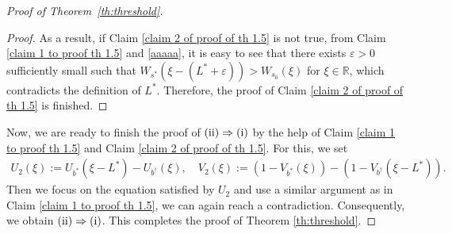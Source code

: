 \documentclass[11pt,a4paper]{article}
\numberwithin{equation}{section}
\numberwithin{figure}{section}
\newcommand\beaa{\begin{eqnarray*}}
\newcommand\eeaa{\end{eqnarray*}}
\begin{document}
\begin{proof}[Proof of Theorem~\ref{th:threshold}]
\begin{proof}
As a result, if Claim \ref{claim 2 of proof of th 1.5} is not true,
from Claim \ref{claim 1 to proof th 1.5} and \eqref{aaaaa}, %
it is easy to see that there exists
$\varepsilon>0$ sufficiently small such that
$W_{s^*}(\xi-(L^*+\varepsilon))> W_{s_0}(\xi)$ for $\xi\in\mathbb{R}$,
which contradicts the definition of $L^*$. Therefore,
the proof of Claim \ref{claim 2 of proof of th 1.5} is finished.
\end{proof}


Now, we are ready to finish the proof of ${\rm(ii)}\Rightarrow {\rm(i)}$
by the help of Claim \ref{claim 1 to proof th 1.5} and  Claim  \ref{claim 2 of proof of th 1.5}.
For this, we set
\beaa
U_2(\xi):=U_{b^*}(\xi-L^*)-U_{b^\dag}(\xi), \quad V_2(\xi):= (1-V_{b^*}(\xi))-(1-V_{b^\dag}(\xi-L^*)).
\eeaa
Then we focus on the equation satisfied by $U_2$ and
use a similar argument as in Claim \ref{claim 1 to proof th 1.5}, we can again reach a contradiction.
Consequently, we obtain
${\rm(ii)}\Rightarrow {\rm(i)}$.  This completes the proof of Theorem \ref{th:threshold}.
\end{proof}


\bigskip

\end{document}
